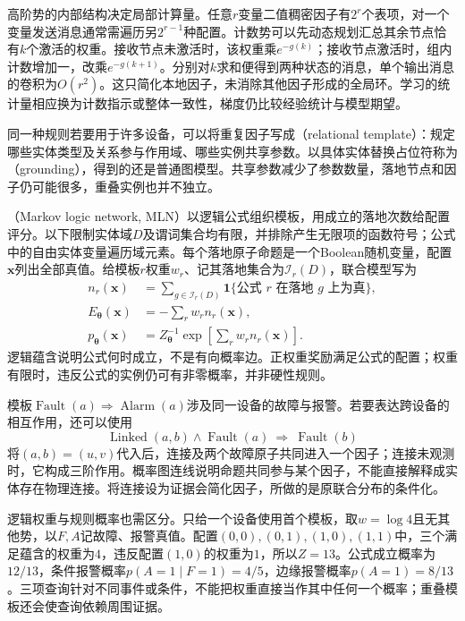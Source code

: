高阶势的内部结构决定局部计算量。任意$r$变量二值稠密因子有$2^r$个表项，对一个变量发送消息通常需遍历另$2^{r-1}$种配置。计数势可以先动态规划汇总其余节点恰有$k$个激活的权重。接收节点未激活时，该权重乘$e^{-g(k)}$；接收节点激活时，组内计数增加一，改乘$e^{-g(k+1)}$。分别对$k$求和便得到两种状态的消息，单个输出消息的卷积为$O(r^2)$。这只简化本地因子，未消除其他因子形成的全局环。学习的统计量相应换为计数指示或整体一致性，梯度仍比较经验统计与模型期望。

同一种规则若要用于许多设备，可以将重复因子写成（relational template）：规定哪些实体类型及关系参与作用域、哪些实例共享参数。以具体实体替换占位符称为（grounding），得到的还是普通图模型。共享参数减少了参数数量，落地节点和因子仍可能很多，重叠实例也并不独立。

（Markov logic network, MLN）以逻辑公式组织模板，用成立的落地次数给配置评分。以下限制实体域$D$及谓词集合均有限，并排除产生无限项的函数符号；公式中的自由实体变量遍历域元素。每个落地原子命题是一个Boolean随机变量，配置$\bm{x}$列出全部真值。给模板$r$权重$w_r$、记其落地集合为$\mathcal{I}_r(D)$，联合模型写为
\begin{equation}
  \begin{aligned}
    n_r(\bm{x})
      &=\sum_{g\in\mathcal{I}_r(D)}
           \mathbf{1}\{\text{公式 }r\text{ 在落地 }g\text{ 上为真}\},\\
    E_{\bm{\theta}}(\bm{x})&=-\sum_rw_rn_r(\bm{x}),\\
    p_{\bm{\theta}}(\bm{x})
      &=Z_{\bm{\theta}}^{-1}
          \exp\!\left[\sum_rw_rn_r(\bm{x})\right].
  \end{aligned}
  \label{eq:pgm-energy-models-mln}
\end{equation}
逻辑蕴含说明公式何时成立，不是有向概率边。正权重奖励满足公式的配置；权重有限时，违反公式的实例仍可有非零概率，并非硬性规则。

模板$\operatorname{Fault}(a)\Rightarrow\operatorname{Alarm}(a)$涉及同一设备的故障与报警。若要表达跨设备的相互作用，还可以使用
\[
  \operatorname{Linked}(a,b)\land\operatorname{Fault}(a)
       \ \Rightarrow\ \operatorname{Fault}(b)
\]
将$(a,b)=(u,v)$代入后，连接及两个故障原子共同进入一个因子；连接未观测时，它构成三阶作用。概率图连线说明命题共同参与某个因子，不能直接解释成实体存在物理连接。将连接设为证据会简化因子，所做的是原联合分布的条件化。

逻辑权重与规则概率也需区分。只给一个设备使用首个模板，取$w=\log4$且无其他势，以$F,A$记故障、报警真值。配置$(0,0),(0,1),(1,0),(1,1)$中，三个满足蕴含的权重为$4$，违反配置$(1,0)$的权重为$1$，所以$Z=13$。公式成立概率为$12/13$，条件报警概率$p(A=1\mid F=1)=4/5$，边缘报警概率$p(A=1)=8/13$。三项查询针对不同事件或条件，不能把权重直接当作其中任何一个概率；重叠模板还会使查询依赖周围证据。


